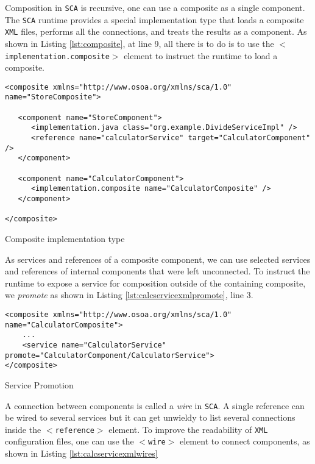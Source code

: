 Composition in \texttt{SCA} is recursive, one can use a composite as a single component. The \texttt{SCA} runtime provides a special implementation
type that loads a composite \texttt{XML} files, performs all the connections, and treats the results as a component. As shown in Listing
\ref{lst:composite}, at line 9, all there is to do is to use the \texttt{$<$implementation.composite$>$} element to instruct the runtime
to load a composite.

\begin{listing}
\begin{verbatim}
<composite xmlns="http://www.osoa.org/xmlns/sca/1.0" name="StoreComposite">

   <component name="StoreComponent">
      <implementation.java class="org.example.DivideServiceImpl" />
      <reference name="calculatorService" target="CalculatorComponent" />
   </component>

   <component name="CalculatorComponent">
      <implementation.composite name="CalculatorComposite" />
   </component>

</composite>
\end{verbatim}
\caption{Composite implementation type}
\label{lst:composite}
\end{listing}

As services and references of a composite component, we can use selected services and references of internal components
that were left unconnected. To instruct the runtime to expose a service for composition outside of the containing composite,
we \emph{promote} as shown in Listing \ref{lst:calcservicexmlpromote}, line 3.

\begin{listing}
\begin{verbatim}
<composite xmlns="http://www.osoa.org/xmlns/sca/1.0" name="CalculatorComposite">
    ...
    <service name="CalculatorService" promote="CalculatorComponent/CalculatorService">
</composite>
\end{verbatim}
\caption{Service Promotion}
\label{lst:calcservicexmlpromote}
\end{listing}

A connection between components is called a \emph{wire} in \texttt{SCA}. A single reference can be wired to several services
but it can get unwieldy to list several connections inside the \texttt{$<$reference$>$} element. To improve the readability
of \texttt{XML} configuration files, one can use the \texttt{$<$wire$>$} element to connect components, as shown in Listing 
\ref{lst:calcservicexmlwires}

